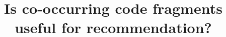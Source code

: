 \documentclass[conference]{IEEEtran}
\begin{document}
\title{Is co-occurring code fragments useful for recommendation?\\
}


\maketitle
\end{document}
